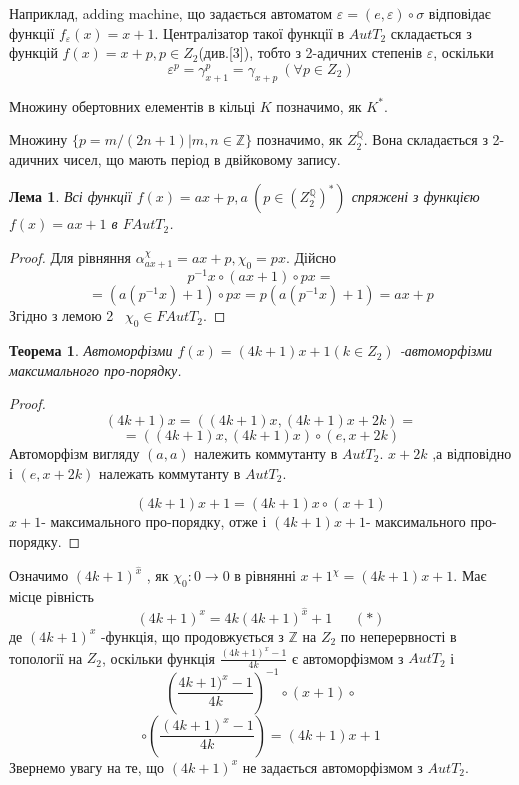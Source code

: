 \documentclass[a4paper,12pt]{article} \usepackage{a4wide}
\numberwithin{equation}{subsection}
\newtheorem{theorem}{Теорема}[subsection]
\newtheorem{lemma}{Лема}[subsection]
\begin{document}
      Наприклад, adding machine, що задається автоматом  $\varepsilon=(e,\varepsilon)\circ  \sigma$
    відповідає функції $f_{\varepsilon}(x)=x+1$. Централізатор такої функції в $AutT_2$ складається
     з функцій $f(x)=x+p,p\in Z_2$(див.[3]), тобто з 2-адичних степенів $\varepsilon$, оскільки
     $$\varepsilon^p=\gamma_{x+1}^p=\gamma_{x+p}\  (\forall p\in Z_2)$$

     Множину обертовних елементів в кільці $K$ позначимо, як
      $K^{* }$.


      Множину $\{p=m/(2n+1)|m,n \in \mathbb{Z}\}$ позначимо, як
      $Z_2^{\mathbb{Q}}$.
     Вона складається з 2-адичних чисел, що мають період в двійковому запису.



\begin{lemma}
Всі функції $f(x)=ax+p,a \ (p\in (Z_2^{\mathbb{Q}})^*  )$ спряжені з
функцією $f(x)=ax+1$  в $FAutT_2$.
\end{lemma}
\begin{proof}
Для рівняння $\alpha^{\chi}_{ax+1}={ax+p}, \chi_0=px$. Дійсно
$${p^{-1}x}\circ  (ax+1)\circ  {px}=$$ $$=(a(p^{-1}x)+1)\circ  {px}={p(a(p^{-1}x)+1)}={ax+p}$$
 Згідно з лемою 2 \ $\chi_0\in FAutT_2$.
\end{proof}

\begin{theorem}
Автоморфізми $f(x)=(4k+1)  x+1 (k\in Z_2)$ -автоморфізми
максимального про-порядку.
\end{theorem}
\begin{proof}
$${(4k+1)x}=({(4k+1)  x},{(4k+1)x+2k})=$$
$$=({(4k+1)x},{(4k+1)x})\circ  (e,{x+2k})$$
 Автоморфізм вигляду $(a,a)$ належить коммутанту в $AutT_2$. ${x+2k}$ ,а відповідно
 і $(e,{x+2k})$
 належать коммутанту в $AutT_2$.

 $${(4k+1)x+1}={(4k+1)x}\circ  (x+1)$$
 ${x+1}$- максимального про-порядку, отже і ${(4k+1)x+1}$- максимального
 про-порядку.

\end{proof}
Означимо $(4k+1)^{\widehat{x}}$ , як $\chi_0:0\rightarrow 0$  в
рівнянні ${x+1}^{\chi}={(4k+1)x+1}$. Має місце рівність
$$(4k+1)^x=4k  (4k+1)^{\widehat{x}}+1 \ \ \ \ \ \ \ (* )$$ де
$(4k+1)^x$ -функція, що продовжується з $\mathbb{Z} $ на $Z_2 $ по
неперервності в топології на $Z_2 $, оскільки функція
$\frac{(4k+1)^x-1}{4k}$ є автоморфізмом з $AutT_2$ і
$$( \frac{4k+1)^x-1}{4k} )^{-1}\circ  (x+1) \circ$$ $$\circ  ( \frac{(4k+1)^x-1}{4k} )=(4k+1)x+1$$ Звернемо увагу на те, що
$(4k+1)^x$ не задається автоморфізмом з $AutT_2$.
\end{document}
